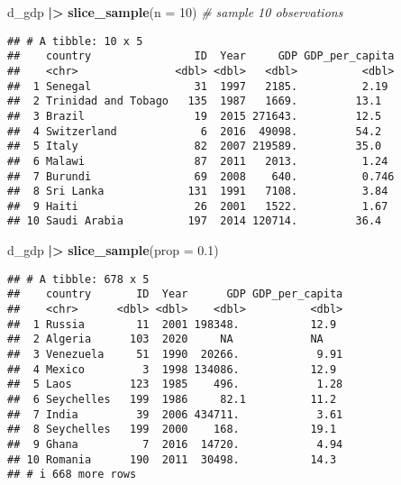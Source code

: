 \documentclass[
]{article}
\newenvironment{Shaded}{\begin{snugshade}}{\end{snugshade}}
\newcommand{\AttributeTok}[1]{\textcolor[rgb]{0.13,0.29,0.53}{#1}}
\newcommand{\CommentTok}[1]{\textcolor[rgb]{0.56,0.35,0.01}{\textit{#1}}}
\newcommand{\DecValTok}[1]{\textcolor[rgb]{0.00,0.00,0.81}{#1}}
\newcommand{\FloatTok}[1]{\textcolor[rgb]{0.00,0.00,0.81}{#1}}
\newcommand{\FunctionTok}[1]{\textcolor[rgb]{0.13,0.29,0.53}{\textbf{#1}}}
\newcommand{\NormalTok}[1]{#1}
\newcommand{\SpecialCharTok}[1]{\textcolor[rgb]{0.81,0.36,0.00}{\textbf{#1}}}
\begin{document}
\begin{Shaded}
\begin{Highlighting}[]
\NormalTok{d\_gdp }\SpecialCharTok{|\textgreater{}}
  \FunctionTok{slice\_sample}\NormalTok{(}\AttributeTok{n =} \DecValTok{10}\NormalTok{) }\CommentTok{\# sample 10 observations}
\end{Highlighting}
\end{Shaded}

\begin{verbatim}
## # A tibble: 10 x 5
##    country                ID  Year     GDP GDP_per_capita
##    <chr>               <dbl> <dbl>   <dbl>          <dbl>
##  1 Senegal                31  1997   2185.          2.19 
##  2 Trinidad and Tobago   135  1987   1669.         13.1  
##  3 Brazil                 19  2015 271643.         12.5  
##  4 Switzerland             6  2016  49098.         54.2  
##  5 Italy                  82  2007 219589.         35.0  
##  6 Malawi                 87  2011   2013.          1.24 
##  7 Burundi                69  2008    640.          0.746
##  8 Sri Lanka             131  1991   7108.          3.84 
##  9 Haiti                  26  2001   1522.          1.67 
## 10 Saudi Arabia          197  2014 120714.         36.4
\end{verbatim}

\begin{Shaded}
\begin{Highlighting}[]
\NormalTok{d\_gdp }\SpecialCharTok{|\textgreater{}}
  \FunctionTok{slice\_sample}\NormalTok{(}\AttributeTok{prop =} \FloatTok{0.1}\NormalTok{) }
\end{Highlighting}
\end{Shaded}

\begin{verbatim}
## # A tibble: 678 x 5
##    country       ID  Year      GDP GDP_per_capita
##    <chr>      <dbl> <dbl>    <dbl>          <dbl>
##  1 Russia        11  2001 198348.           12.9 
##  2 Algeria      103  2020     NA            NA   
##  3 Venezuela     51  1990  20266.            9.91
##  4 Mexico         3  1998 134086.           12.9 
##  5 Laos         123  1985    496.            1.28
##  6 Seychelles   199  1986     82.1          11.2 
##  7 India         39  2006 434711.            3.61
##  8 Seychelles   199  2000    168.           19.1 
##  9 Ghana          7  2016  14720.            4.94
## 10 Romania      190  2011  30498.           14.3 
## # i 668 more rows
\end{verbatim}
\end{document}
